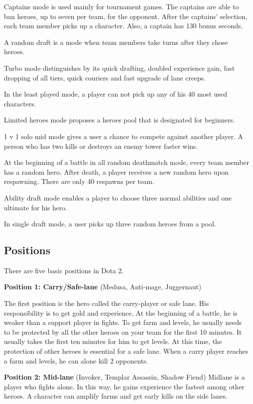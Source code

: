 \documentclass[12pt,twoside,english,a4paper]{article}
\begin{document}
Captains mode is used mainly for tournament games. The captains are able to ban heroes, up to seven per team, for the opponent. After the captains’ selection, each team member picks up a character. Also, a captain has 130 bonus seconds. 

A random draft is a mode when team members take turns after they chose heroes.

Turbo mode distinguishes by its quick drafting, doubled experience gain, fast dropping of all tiers, quick couriers and fast upgrade of lane creeps.

In the least played mode, a player can not pick up any of his 40 most used characters.

Limited heroes mode proposes a heroes pool that is designated for beginners.

1 v 1 solo mid mode gives a user a chance to compete against another player. A person who has two kills or destroys an enemy tower faster wins.

At the beginning of a battle in all random deathmatch mode, every team member has a random hero. After death, a player receives a new random hero upon respawning. There are only 40 respawns per team. 

Ability draft mode enables a player to choose three normal abilities and one ultimate for his hero.

In single draft mode, a user picks up three random heroes from a pool.

\subsection{Positions} \label{positions}
There are five basic positions in Dota 2.\cite{ Balaji:Dota}

\textbf{Position 1: Carry/Safe-lane} (Medusa, Anti-mage, Juggernaut)

The first position is the hero called the carry-player or safe lane. 
His responsibility is to get gold and experience. At the beginning of a battle, he is weaker than a support player in fights. To get farm and levels, he usually needs to be protected by all the other heroes on your team for the first 10 minutes. It usually takes the first ten minutes for him to get levels. At this time, the protection of other heroes is essential for a safe lane. When a carry player reaches a farm and levels, he can alone kill 2 opponents.

\textbf{Position 2: Mid-lane}      (Invoker, Templar Assassin, Shadow Fiend)
Midlane is a player who fights alone. In this way, he gains experience the fastest among other heroes. A character can amplify farms and get early kills on the side lanes.
\end{document}
